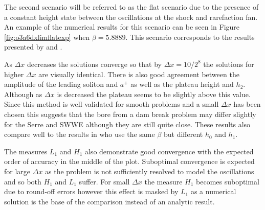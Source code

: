 \documentclass[SingleSpace,12pt,Journal]{Serre_ASCE}
\begin{document}
The second scenario will be referred to as the flat scenario due to the presence of a constant height state between the oscillations at the shock and rarefaction fan. An example of the numerical results for this scenario can be seen in Figure \ref{fig:o3a6dxlimflatexp} when $\beta = 5.8889$. This scenario corresponds to the results presented by  and . 

As $\Delta x$ decreases the solutions converge so that by $\Delta x = 10 / 2^8$ the solutions for higher $\Delta x$ are visually identical. There is also good agreement between the amplitude of the leading soliton and $a^+$ as well as the plateau height and $h_2$. Although as $\Delta x$ is decreased the plateau seems to be slightly above this value. Since this method is well validated for smooth problems and a small $\Delta x$ has been chosen this suggests that the bore from a dam break problem may differ slightly for the Serre and SWWE although they are still quite close. These results also compare well to the results in  who use the same $\beta$ but different $h_0$ and $h_1$. 

The measures $L_1$ and $H_1$ also demonstrate good convergence with the expected order of accuracy in the middle of the plot. Suboptimal convergence is expected for large $\Delta x$ as the problem is not sufficiently resolved to model the oscillations and so both $H_1$ and $L_1$ suffer. For small $\Delta x$ the measure $H_1$ becomes suboptimal due to round-off errors however this effect is masked by $L_1$ as a numerical solution is the base of the comparison instead of an analytic result.
\end{document}
